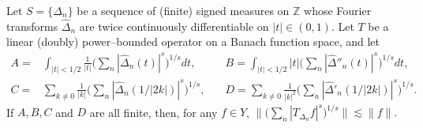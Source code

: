 \documentclass[10pt,a4paper]{amsart}
\begin{document}
\begin{lemma}\label{lem:basic} 
Let $S=\{\Delta_n\}$ be a sequence of (finite) signed measures on $\mathbb Z$ whose Fourier transforms $\hat\Delta_n$ 
are twice continuously differentiable on $|t|\in (0,1)$. Let $T$ be a linear (doubly) power--bounded operator on a Banach function space, and
let
\begin{align*} 
A= & \int_{|t|<1/2} \frac 1{|t|} \Big( \sum_n |\hat \Delta_n(t)|^s \Big)^{1/s} dt,  \quad
& B=  \int_{|t|<1/2} |t| \Big( \sum_n |\hat \Delta''_n(t)|^s \Big)^{1/s} dt, \\
 C=& \sum_{k\neq 0} \frac 1{|k|} \Big( \sum_n |\hat \Delta_n(1/|2k|)|^s \Big)^{1/s},  \quad
 & D= \sum_{k\neq 0} \frac 1{|k|^2} \Big( \sum_n |\hat \Delta'_n(1/|2k|)|^s \Big)^{1/s}. 
\end{align*}
If $A, B, C$ and $D$ are all finite,  then, for any $f\in Y$,
$\Big\lVert  \Big( \sum_n |T_{\Delta_n}f|^s \Big)^{1/s} \Big\rVert \lesssim \lVert f\rVert.$
\end{lemma}
\end{document}
